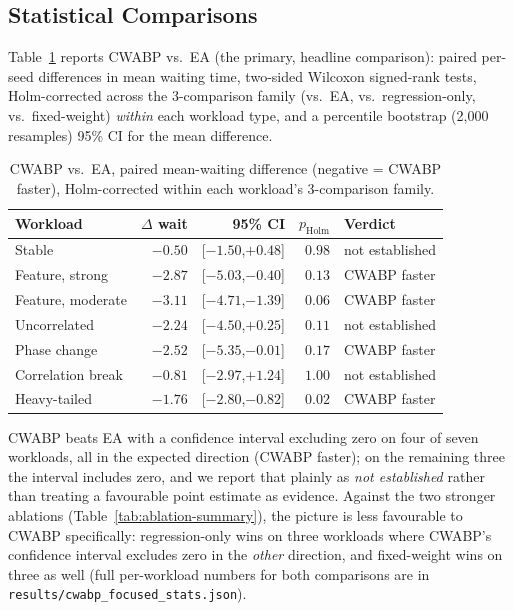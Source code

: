 \documentclass[10pt,twocolumn]{article}
\begin{document}
\subsection{Statistical Comparisons}
Table~\ref{tab:stats} reports CWABP vs.\ EA (the primary, headline comparison): paired per-seed differences in mean waiting time, two-sided Wilcoxon signed-rank tests, Holm-corrected across the 3-comparison family (vs.\ EA, vs.\ regression-only, vs.\ fixed-weight) \emph{within} each workload type, and a percentile bootstrap (2{,}000 resamples) 95\% CI for the mean difference.

\begin{table}[h]
\centering
\caption{CWABP vs.\ EA, paired mean-waiting difference (negative = CWABP faster), Holm-corrected within each workload's 3-comparison family.}
\label{tab:stats}
\scriptsize
\setlength{\tabcolsep}{2.6pt}
\begin{tabular}{lrrrl}
\toprule
\textbf{Workload} & \textbf{$\Delta$ wait} & \textbf{95\% CI} & \textbf{$p_{\mathrm{Holm}}$} & \textbf{Verdict} \\
\midrule
Stable & $-0.50$ & [$-1.50$,$+0.48$] & $0.98$ & not established \\
Feature, strong & $-2.87$ & [$-5.03$,$-0.40$] & $0.13$ & CWABP faster \\
Feature, moderate & $-3.11$ & [$-4.71$,$-1.39$] & $0.06$ & CWABP faster \\
Uncorrelated & $-2.24$ & [$-4.50$,$+0.25$] & $0.11$ & not established \\
Phase change & $-2.52$ & [$-5.35$,$-0.01$] & $0.17$ & CWABP faster \\
Correlation break & $-0.81$ & [$-2.97$,$+1.24$] & $1.00$ & not established \\
Heavy-tailed & $-1.76$ & [$-2.80$,$-0.82$] & $0.02$ & CWABP faster \\
\bottomrule
\end{tabular}
\end{table}

CWABP beats EA with a confidence interval excluding zero on four of seven workloads, all in the expected direction (CWABP faster); on the remaining three the interval includes zero, and we report that plainly as \emph{not established} rather than treating a favourable point estimate as evidence. Against the two stronger ablations (Table~\ref{tab:ablation-summary}), the picture is less favourable to CWABP specifically: regression-only wins on three workloads where CWABP's confidence interval excludes zero in the \emph{other} direction, and fixed-weight wins on three as well (full per-workload numbers for both comparisons are in \texttt{results/cwabp\_focused\_stats.json}).
\end{document}
